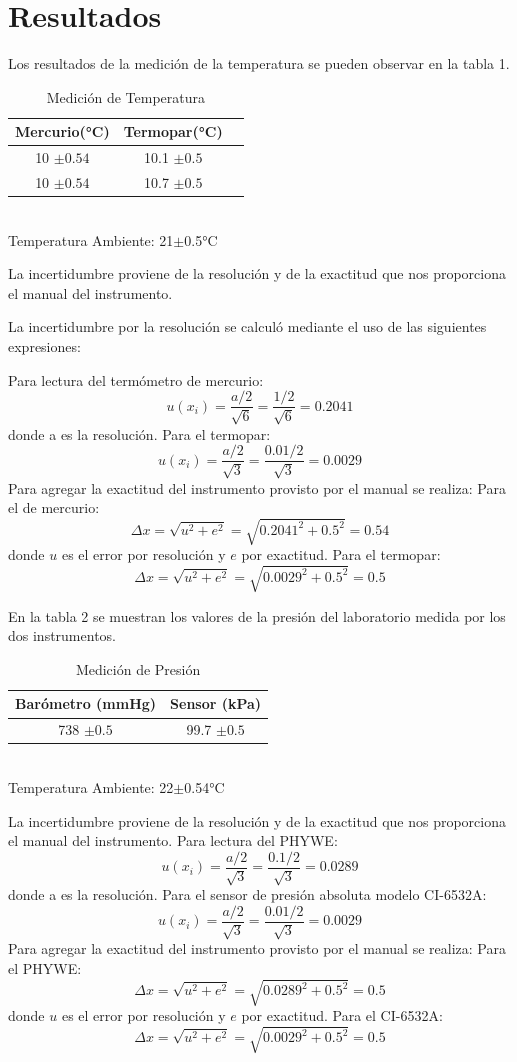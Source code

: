 \documentclass[12pt]{article}
\begin{document}
\section{Resultados}
	Los resultados de la medición de la temperatura se pueden observar en la tabla  1. 
\begin{table}[H] 
\centering
\begin{tabular}{|c|c|c|}
\hline
Mercurio(°C) & Termopar(°C) \\\hline
10 $\pm 0.54$ & 10.1 $\pm 0.5$ \\ \hline
10 $\pm 0.54$ & 10.7 $\pm 0.5$\\ \hline
\end{tabular}
\\
Temperatura Ambiente: 21$\pm$0.5°C\\
\caption{Medición de Temperatura}
\end{table}
La incertidumbre proviene de la resolución y de la exactitud que nos proporciona el manual del instrumento.

La incertidumbre por la resolución se calculó mediante el uso de las siguientes expresiones:

Para lectura del termómetro de mercurio:
$$ u(x_i) = \frac{a/2}{\sqrt{6}} = \frac{1/2}{\sqrt{6}} = 0.2041$$
donde a es la resolución. Para el termopar:
$$ u(x_i) = \frac{a/2}{\sqrt{3}} = \frac{0.01/2}{\sqrt{3}} = 0.0029$$
Para agregar la exactitud del instrumento provisto por el manual se realiza:
Para el de mercurio:
$$ \Delta x = \sqrt{u^2+ e^2} = \sqrt{ 0.2041^2+ 0.5^2} = 0.54$$
donde $u$ es el error por resolución y $e$ por exactitud. Para el termopar:
$$ \Delta x = \sqrt{u^2+ e^2} = \sqrt{ 0.0029^2+ 0.5^2} = 0.5$$

En la tabla 2 se muestran los valores de la presión del laboratorio medida por los dos instrumentos.
\begin{table}[H]
\centering
\begin{tabular}{|c|c|}
\hline
Barómetro (mmHg) & Sensor (kPa)  \\\hline
738 $\pm0.5$ & 99.7 $\pm0.5$  \\ \hline
\end{tabular}\\
Temperatura Ambiente: 22$\pm$0.54°C\\
\caption{Medición de Presión}
\end{table}
La incertidumbre proviene de la resolución y de la exactitud que nos proporciona el manual del instrumento.	
Para lectura del PHYWE:
$$ u(x_i) = \frac{a/2}{\sqrt{3}} = \frac{0.1/2}{\sqrt{3}} = 0.0289$$
donde a es la resolución. Para el sensor de presión absoluta modelo CI-6532A:
$$ u(x_i) = \frac{a/2}{\sqrt{3}} = \frac{0.01/2}{\sqrt{3}} = 0.0029$$
Para agregar la exactitud del instrumento provisto por el manual se realiza:
Para el PHYWE:
$$ \Delta x = \sqrt{u^2+ e^2} = \sqrt{ 0.0289^2+ 0.5^2} = 0.5$$
donde $u$ es el error por resolución y $e$ por exactitud. Para el CI-6532A:
$$ \Delta x = \sqrt{u^2+ e^2} = \sqrt{ 0.0029^2+ 0.5^2} = 0.5$$
\end{document}
